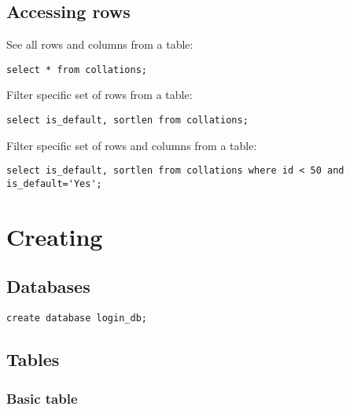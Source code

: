 \documentclass[11pt]{article}
\begin{document}
\subsection{Accessing rows}
\label{sec:orgheadline9}
See all rows and columns from a table:
\begin{verbatim}
select * from collations;
\end{verbatim}
Filter specific set of rows from a table:
\begin{verbatim}
select is_default, sortlen from collations;
\end{verbatim}
Filter specific set of rows and columns from a table:
\begin{verbatim}
select is_default, sortlen from collations where id < 50 and is_default='Yes';
\end{verbatim}
\section{Creating}
\label{sec:orgheadline14}
\subsection{Databases}
\label{sec:orgheadline11}
\begin{verbatim}
create database login_db;
\end{verbatim}
\subsection{Tables}
\label{sec:orgheadline13}
\subsubsection{Basic table}
\label{sec:orgheadline12}
\end{document}
